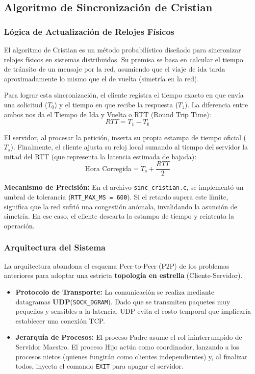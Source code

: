 \subsection{Algoritmo de Sincronización de Cristian}

\subsubsection{Lógica de Actualización de Relojes Físicos}

El algoritmo de Cristian es un método probabilístico diseñado para sincronizar relojes físicos en sistemas distribuidos. Su premisa se basa en calcular el tiempo de tránsito de un mensaje por la red, asumiendo que el viaje de ida tarda aproximadamente lo mismo que el de vuelta (simetría en la red).

Para lograr esta sincronización, el cliente registra el tiempo exacto en que envía una solicitud ($T_0$) y el tiempo en que recibe la respuesta ($T_1$). La diferencia entre ambos nos da el Tiempo de Ida y Vuelta o RTT (Round Trip Time):
\[ RTT = T_1 - T_0 \]

El servidor, al procesar la petición, inserta su propia estampa de tiempo oficial ($T_s$). Finalmente, el cliente ajusta su reloj local sumando al tiempo del servidor la mitad del RTT (que representa la latencia estimada de bajada):
\[ \text{Hora Corregida} = T_s + \frac{RTT}{2} \]

\textbf{Mecanismo de Precisión:} En el archivo \texttt{sinc\_cristian.c}, se implementó un umbral de tolerancia (\texttt{RTT\_MAX\_MS = 600}). Si el retardo supera este límite, significa que la red sufrió una congestión anómala, invalidando la asunción de simetría. En ese caso, el cliente descarta la estampa de tiempo y reintenta la operación.

\subsubsection{Arquitectura del Sistema}

La arquitectura abandona el esquema Peer-to-Peer (P2P) de los problemas anteriores para adoptar una estricta \textbf{topología en estrella} (Cliente-Servidor).
\begin{itemize}
    \item \textbf{Protocolo de Transporte:} La comunicación se realiza mediante datagramas \textbf{UDP}(\texttt{SOCK\_DGRAM}). Dado que se transmiten paquetes muy pequeños y sensibles a la latencia, UDP evita el costo temporal que implicaría establecer una conexión TCP.
    \item \textbf{Jerarquía de Procesos:} El proceso Padre asume el rol ininterrumpido de Servidor Maestro. El proceso Hijo actúa como coordinador, lanzando a los procesos nietos (quienes fungirán como clientes independientes) y, al finalizar todos, inyecta el comando \texttt{EXIT} para apagar el servidor.
\end{itemize}

